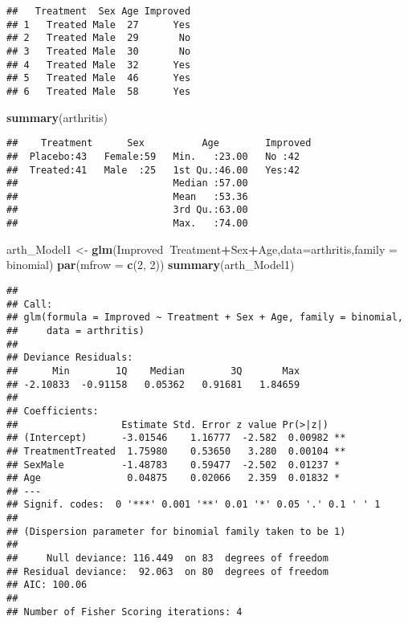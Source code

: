 \documentclass[]{article}
\newenvironment{Shaded}{\begin{snugshade}}{\end{snugshade}}
\newcommand{\KeywordTok}[1]{\textcolor[rgb]{0.13,0.29,0.53}{\textbf{#1}}}
\newcommand{\DataTypeTok}[1]{\textcolor[rgb]{0.13,0.29,0.53}{#1}}
\newcommand{\DecValTok}[1]{\textcolor[rgb]{0.00,0.00,0.81}{#1}}
\newcommand{\StringTok}[1]{\textcolor[rgb]{0.31,0.60,0.02}{#1}}
\newcommand{\OperatorTok}[1]{\textcolor[rgb]{0.81,0.36,0.00}{\textbf{#1}}}
\newcommand{\NormalTok}[1]{#1}
\begin{document}
\begin{verbatim}
##   Treatment  Sex Age Improved
## 1   Treated Male  27      Yes
## 2   Treated Male  29       No
## 3   Treated Male  30       No
## 4   Treated Male  32      Yes
## 5   Treated Male  46      Yes
## 6   Treated Male  58      Yes
\end{verbatim}

\begin{Shaded}
\begin{Highlighting}[]
\KeywordTok{summary}\NormalTok{(arthritis)}
\end{Highlighting}
\end{Shaded}

\begin{verbatim}
##    Treatment      Sex          Age        Improved
##  Placebo:43   Female:59   Min.   :23.00   No :42  
##  Treated:41   Male  :25   1st Qu.:46.00   Yes:42  
##                           Median :57.00           
##                           Mean   :53.36           
##                           3rd Qu.:63.00           
##                           Max.   :74.00
\end{verbatim}

\begin{Shaded}
\begin{Highlighting}[]
\NormalTok{arth_Model1 <-}\StringTok{ }\KeywordTok{glm}\NormalTok{(Improved}\OperatorTok{~}\NormalTok{Treatment}\OperatorTok{+}\NormalTok{Sex}\OperatorTok{+}\NormalTok{Age,}\DataTypeTok{data=}\NormalTok{arthritis,}\DataTypeTok{family =}\NormalTok{ binomial)}
\KeywordTok{par}\NormalTok{(}\DataTypeTok{mfrow =} \KeywordTok{c}\NormalTok{(}\DecValTok{2}\NormalTok{, }\DecValTok{2}\NormalTok{))}
\KeywordTok{summary}\NormalTok{(arth_Model1)}
\end{Highlighting}
\end{Shaded}

\begin{verbatim}
## 
## Call:
## glm(formula = Improved ~ Treatment + Sex + Age, family = binomial, 
##     data = arthritis)
## 
## Deviance Residuals: 
##      Min        1Q    Median        3Q       Max  
## -2.10833  -0.91158   0.05362   0.91681   1.84659  
## 
## Coefficients:
##                  Estimate Std. Error z value Pr(>|z|)   
## (Intercept)      -3.01546    1.16777  -2.582  0.00982 **
## TreatmentTreated  1.75980    0.53650   3.280  0.00104 **
## SexMale          -1.48783    0.59477  -2.502  0.01237 * 
## Age               0.04875    0.02066   2.359  0.01832 * 
## ---
## Signif. codes:  0 '***' 0.001 '**' 0.01 '*' 0.05 '.' 0.1 ' ' 1
## 
## (Dispersion parameter for binomial family taken to be 1)
## 
##     Null deviance: 116.449  on 83  degrees of freedom
## Residual deviance:  92.063  on 80  degrees of freedom
## AIC: 100.06
## 
## Number of Fisher Scoring iterations: 4
\end{verbatim}
\end{document}
